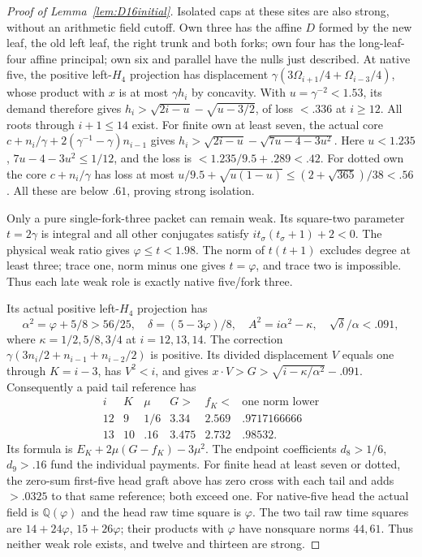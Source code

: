 \documentclass[11pt]{article}
\begin{document}
\begin{proof}[Proof of Lemma~\ref{lem:D16initial}]
Isolated caps at these sites are also strong, without an arithmetic
field cutoff. Own three has the affine $D$ formed by the new leaf,
the old left leaf, the right trunk and both forks; own four has the
long-leaf-four affine principal; own six and parallel have the
nulls just described. At native five, the positive left-$H_4$
projection has displacement
$\gamma(3\Omega_{i+1}/4+\Omega_{i-3}/4)$, whose product with
$x$ is at most $\gamma h_i$ by concavity.
With $u=\gamma^{-2}<1.53$, its demand therefore gives
$h_i>\sqrt{2i-u}-\sqrt{u-3/2}$, of loss $<.336$ at $i\ge12$.
All roots through $i+1\le14$ exist.
For finite own at least seven, the actual core
$c+n_i/\gamma+2(\gamma^{-1}-\gamma)n_{i-1}$ gives
$h_i>\sqrt{2i-u}-\sqrt{7u-4-3u^2}$.
Here $u<1.235$, $7u-4-3u^2\le1/12$, and the loss is
$<1.235/9.5+.289<.42$.
For dotted own the core $c+n_i/\gamma$ has loss at most
$u/9.5+\sqrt{u(1-u)}\le(2+\sqrt{365})/38<.56$.
All these are below $.61$, proving strong isolation.

Only a pure single-fork-three packet can remain weak.
Its square-two parameter $t=2\gamma$ is integral and all other
conjugates satisfy $it_\sigma(t_\sigma+1)+2<0$.
The physical weak ratio gives $\varphi\le t<1.98$.
The norm of $t(t+1)$ excludes degree at least three; trace one,
norm minus one gives $t=\varphi$, and trace two is impossible.
Thus each late weak role is exactly native five/fork three.

Its actual positive left-$H_4$ projection has
\[
\alpha^2=\varphi+5/8>56/25,\quad
\delta=(5-3\varphi)/8,\quad
A^2=i\alpha^2-\kappa,\quad \sqrt\delta/\alpha<.091,
\]
where $\kappa=1/2,5/8,3/4$ at $i=12,13,14$.
The correction
$\gamma(3n_i/2+n_{i-1}+n_{i-2}/2)$ is positive.
Its divided displacement $V$ equals one through $K=i-3$,
has $V^2<i$, and gives
$x\cdot V>G>\sqrt{i-\kappa/\alpha^2}-.091$.
Consequently a paid tail reference has
\[
\begin{array}{c|c|c|c|c|c}
i&K&\mu&G>&f_K<&\text{one norm lower}\\\hline
12&9&1/6&3.34&2.569&.9717166666\\
13&10&.16&3.475&2.732&.98532 .
\end{array}
\]
Its formula is $E_K+2\mu(G-f_K)-3\mu^2$.
The endpoint coefficients $d_8>1/6$, $d_9>.16$ fund the
individual payments. For finite head at least seven or dotted,
the zero-sum first-five head graft above has zero cross with
each tail and adds $>.0325$ to that same reference; both exceed one.
For native-five head the actual field is $\mathbb Q(\varphi)$
and the head raw time square is $\varphi$.
The two tail raw time squares are $14+24\varphi$, $15+26\varphi$;
their products with $\varphi$ have nonsquare norms $44,61$.
Thus neither weak role exists, and twelve and thirteen are strong.


\end{proof}
\end{document}
